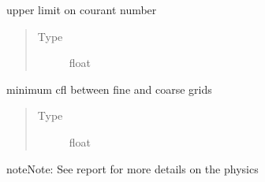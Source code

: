 \documentclass[letterpaper,10pt,english]{sphinxmanual}
\begin{document}
\begin{fulllineitems}
\begin{fulllineitems}
\begin{quote}
\begin{description}
\end{description}\end{quote}

\end{fulllineitems}


\begin{fulllineitems}
\label{\detokenize{autoapi/NavierStokes/index:NavierStokes.NavierStokes.cfl_lim}}
\sphinxAtStartPar
upper limit on courant number
\begin{quote}\begin{description}
\item[{Type}] \leavevmode
\sphinxAtStartPar
float

\end{description}\end{quote}

\end{fulllineitems}


\begin{fulllineitems}
\label{\detokenize{autoapi/NavierStokes/index:NavierStokes.NavierStokes.cfl}}
\sphinxAtStartPar
minimum cfl between fine and coarse grids
\begin{quote}\begin{description}
\item[{Type}] \leavevmode
\sphinxAtStartPar
float

\end{description}\end{quote}

\end{fulllineitems}


\begin{sphinxadmonition}{note}{Note:}
\sphinxAtStartPar
See report for more details on the physics
\end{sphinxadmonition}


\end{fulllineitems}
\end{document}
